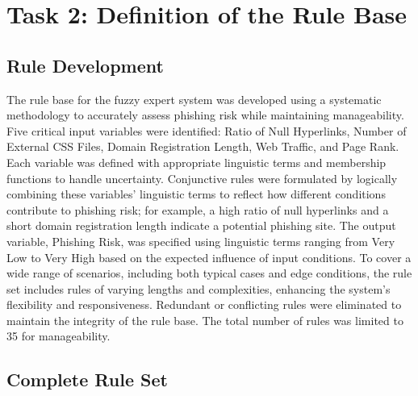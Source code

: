 \documentclass{article}
\begin{document}
\section{Task 2: Definition of the Rule Base}


\subsection{Rule Development}

The rule base for the fuzzy expert system was developed using a systematic methodology to accurately assess phishing risk while maintaining manageability. Five critical input variables were identified: Ratio of Null Hyperlinks, Number of External CSS Files, Domain Registration Length, Web Traffic, and Page Rank. Each variable was defined with appropriate linguistic terms and membership functions to handle uncertainty. Conjunctive rules were formulated by logically combining these variables' linguistic terms to reflect how different conditions contribute to phishing risk; for example, a high ratio of null hyperlinks and a short domain registration length indicate a potential phishing site. The output variable, Phishing Risk, was specified using linguistic terms ranging from Very Low to Very High based on the expected influence of input conditions. To cover a wide range of scenarios, including both typical cases and edge conditions, the rule set includes rules of varying lengths and complexities, enhancing the system's flexibility and responsiveness. Redundant or conflicting rules were eliminated to maintain the integrity of the rule base. The total number of rules was limited to 35 for manageability.

\subsection{Complete Rule Set}
\end{document}
